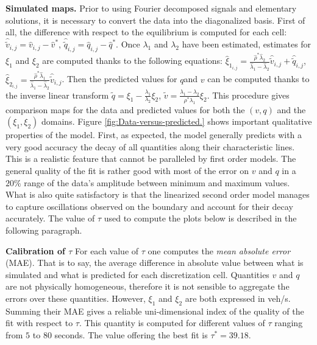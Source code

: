 \documentclass[preprint]{elsarticle}
\begin{document}
\textbf{Simulated maps.} Prior to using Fourier decomposed signals and elementary solutions,
it is necessary to convert the data into the diagonalized basis. First
of all, the difference with respect to the equilibrium is computed
for each cell: $\widehat{\widetilde{v}}_{i,j}=\widehat{v}_{i,j}-\widehat{v}^{*}$,
$\widehat{\widetilde{q}}_{i,j}=\widehat{q}_{i,j}-\widehat{q}^{*}$.
Once $\lambda_{1}$ and $\lambda_{2}$ have been estimated, estimates
for $\xi_{1}$ and $\xi_{2}$ are computed thanks to the following
equations: $\widehat{\xi}_{1_{i,j}}=\frac{\widehat{\rho}^{*}\widehat{\lambda}_{2}}{\widehat{\lambda}_{1}-\widehat{\lambda}_{2}}\widehat{\widetilde{v}}_{i,j}+\widehat{\widetilde{q}}_{i,j}$,
$\widehat{\xi}_{2_{i,j}}=\frac{\widehat{\rho}^{*}\widehat{\lambda}_{1}}{\widehat{\lambda}_{1}-\widehat{\lambda}_{2}}\widehat{\widetilde{v}}_{i,j}$.
Then the predicted values for $q$and $v$ can be computed thanks
to the inverse linear transform $\widetilde{q}=\xi_{1}-\frac{\lambda_{1}}{\lambda_{2}}\xi_{2}$,
$\widetilde{v}=\frac{\lambda_{1}-\lambda_{2}}{\rho^{*}\lambda_{1}}\xi_{2}$.
This procedure gives comparison maps for the data and predicted values
for both the $\left(v,q\right)$ and the $\left(\xi_{1},\xi_{2}\right)$
domains. Figure \ref{fig:Data-versus-predicted.} shows important
qualitative properties of the model. First, as expected, the
model generally predicts with a very good accuracy the decay of all
quantities along their characteristic lines. This is a realistic feature
that cannot be paralleled by first order models. The general quality of the fit is rather good with most of the error on $v$ and $q$ in a $20\%$ range of the data's amplitude between minimum and maximum values. What is also quite satisfactory is that the linearized second order model manages to capture oscillations observed on the boundary and account for their decay accurately. The value of $\tau$ used to compute the plots below is described in the following paragraph.

\textbf{Calibration of $\tau$\label{sub:Calibration-of-tau}} For each value of $\tau$ one computes the \textit{mean absolute error} (MAE).
That is to say, the average difference in absolute value between what
is simulated and what is predicted for each discretization cell. Quantities $v$ and $q$ are not physically homogeneous, therefore it is not
sensible to aggregate the errors over these quantities. However, $\xi_{1}$
and $\xi_{2}$ are both expressed in veh/s. Summing their MAE gives
a reliable uni-dimensional index of the quality of the fit with respect
to $\tau$. This quantity is computed for different values of $\tau$
ranging from $5$ to $80$ seconds. The value offering the best fit
is $\tau^{*}=39.18$.
\end{document}
